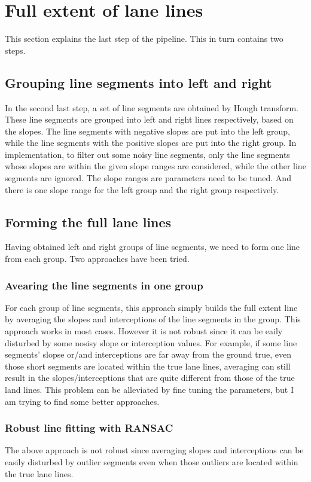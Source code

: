 \documentclass[12pt]{article}
\begin{document}
\section{Full extent of lane lines}
This section explains the last step of the pipeline. This in turn contains two steps. 

\subsection{Grouping line segments into left and right}
In the second last step, a set of line segments are obtained by Hough transform. These line segments are grouped into left and right lines respectively, based on the slopes. The line segments with negative slopes are put into the left group, while the line segments with the positive slopes are put into the right group. In implementation, to filter out some noisy line segments, only the line segments whose slopes are within the given slope ranges are considered, while the other line segments are ignored. The slope ranges are parameters need to be tuned. And there is one slope range for the left group and the right group respectively.

\subsection{Forming the full lane lines}
Having obtained left and right groups of line segments, we need to form one line from each group. Two approaches have been tried.

\subsubsection{Avearing the line segments in one group}
For each group of line segments, this approach simply builds the full extent line by averaging the slopes and interceptions of the line segments in the group. This approach works in most cases. However it is not robust since it can be eaily disturbed by some nosisy slope or interception values. For example, if some line segments' slopse or/and interceptions are far away from the ground true, even those short segments are located within the true lane lines, averaging can still result in the slopes/interceptions that are quite different from those of the true land lines. This problem can be alleviated by fine tuning the parameters, but I am trying to find some better approaches.

\subsubsection{Robust line fitting with RANSAC}
The above approach is not robust since averaging slopes and interceptions can be easily disturbed by outlier segments even when those outliers are located within the true lane lines.
\end{document}
